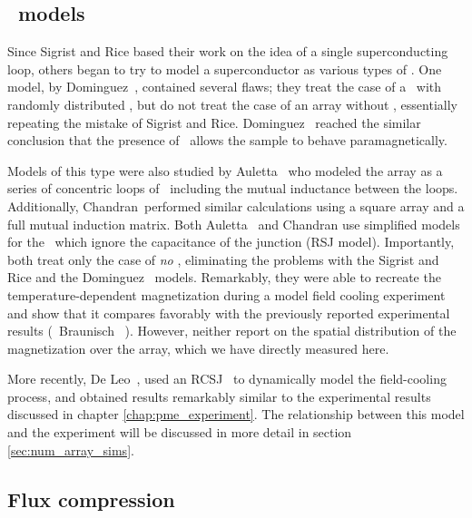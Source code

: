 \subsection{\jja\ models}

Since Sigrist and Rice based their work on the idea of a 
single superconducting loop, others began to try to model a
superconductor as various types of \jjas. One model, 
by Dominguez \etal\,\cite{dominguez_prl_72_2773_1994},
contained several flaws; they treat the case of a \jja\ with 
randomly distributed \pijunctions, but do not treat the case of an
array without \pijunctions, essentially repeating the mistake of 
Sigrist and Rice.
Dominguez \etal\ reached the similar conclusion that 
the presence of \pijunctions\ allows the sample to behave 
paramagnetically. 

Models of this
type were also studied by Auletta \etal\,\cite{auletta_prb_49_12311_1994}
who modeled the array as a series of concentric loops of \jjsnoun\  
including the mutual
inductance between the loops. 
Additionally, Chandran\,\cite{chandran_prb_56_6169_1997}
performed similar calculations using a square array and a full
mutual induction matrix. 
Both Auletta \etal\ and Chandran use 
simplified models for the \jjsnoun\
which ignore the capacitance of the
junction (RSJ model). 
Importantly, both treat only the case of \emph{no} \pijunctions, 
eliminating the problems with the Sigrist and Rice and the Dominguez \etal\
models. 
Remarkably, they were able to recreate the 
temperature-dependent magnetization during a model field cooling experiment
and show that it compares favorably with the 
previously reported experimental results (\cf\ Braunisch \etal\,
\cite{braunisch_prl_68_1908_1992,braunisch_prb_48_4030_1993}).
However, neither report on the spatial distribution of the
magnetization over the array, which we have directly measured
here. 

More recently, De Leo \etal\,\cite{deleo_unpublished}, used  
an RCSJ \jja\ to dynamically model the field-cooling process, and 
obtained results remarkably similar to the experimental results discussed in 
chapter \ref{chap:pme_experiment}. The relationship between this model
and the experiment will be discussed in more detail in section
\ref{sec:num_array_sims}. 

\subsection{Flux compression}

